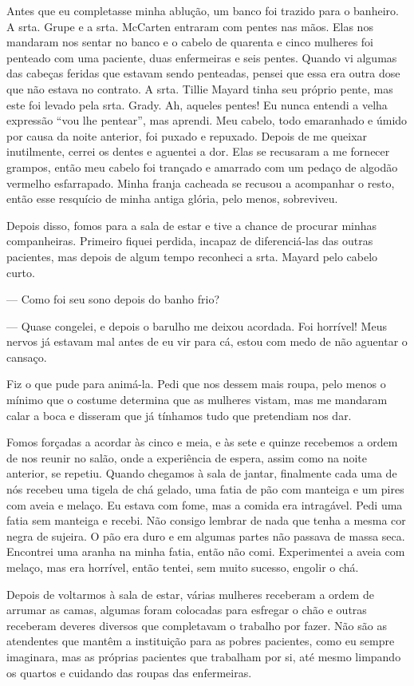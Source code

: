 Antes que eu completasse minha ablução, um banco foi trazido para o
banheiro. A srta. Grupe e a srta. McCarten entraram com pentes nas mãos.
Elas nos mandaram nos sentar no banco e o cabelo de quarenta e cinco
mulheres foi penteado com uma paciente, duas enfermeiras e seis pentes.
Quando vi algumas das cabeças feridas que estavam sendo penteadas,
pensei que essa era outra dose que não estava no contrato. A srta.
Tillie Mayard tinha seu próprio pente, mas este foi levado pela srta.
Grady. Ah, aqueles pentes! Eu nunca entendi a velha expressão ``vou lhe
pentear'', mas aprendi. Meu cabelo, todo emaranhado e úmido por causa da
noite anterior, foi puxado e repuxado. Depois de me queixar inutilmente,
cerrei os dentes e aguentei a dor. Elas se recusaram a me fornecer
grampos, então meu cabelo foi trançado e amarrado com um pedaço de
algodão vermelho esfarrapado. Minha franja cacheada se recusou a
acompanhar o resto, então esse resquício de minha antiga glória, pelo
menos, sobreviveu.

Depois disso, fomos para a sala de estar e tive a chance de procurar
minhas companheiras. Primeiro fiquei perdida, incapaz de diferenciá-las
das outras pacientes, mas depois de algum tempo reconheci a srta. Mayard
pelo cabelo curto.

--- Como foi seu sono depois do banho frio?

--- Quase congelei, e depois o barulho me deixou acordada. Foi horrível!
Meus nervos já estavam mal antes de eu vir para cá, estou com medo de
não aguentar o cansaço.

Fiz o que pude para animá-la. Pedi que nos dessem mais roupa, pelo menos
o mínimo que o costume determina que as mulheres vistam, mas me mandaram
calar a boca e disseram que já tínhamos tudo que pretendiam nos dar.

Fomos forçadas a acordar às cinco e meia, e às sete e quinze recebemos a
ordem de nos reunir no salão, onde a experiência de espera, assim como
na noite anterior, se repetiu. Quando chegamos à sala de jantar,
finalmente cada uma de nós recebeu uma tigela de chá gelado, uma fatia
de pão com manteiga e um pires com aveia e melaço. Eu estava com fome,
mas a comida era intragável. Pedi uma fatia sem manteiga e recebi. Não
consigo lembrar de nada que tenha a mesma cor negra de sujeira. O pão
era duro e em algumas partes não passava de massa seca. Encontrei uma
aranha na minha fatia, então não comi. Experimentei a aveia com melaço,
mas era horrível, então tentei, sem muito sucesso, engolir o chá.

Depois de voltarmos à sala de estar, várias mulheres receberam a ordem
de arrumar as camas, algumas foram colocadas para esfregar o chão e
outras receberam deveres diversos que completavam o trabalho por fazer.
Não são as atendentes que mantêm a instituição para as pobres pacientes,
como eu sempre imaginara, mas as próprias pacientes que trabalham por
si, até mesmo limpando os quartos e cuidando das roupas das enfermeiras.

